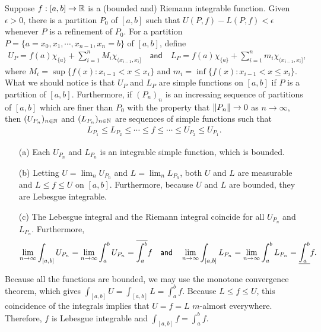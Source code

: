 Suppose $f: [a, b]\rightarrow{\mathbb{R}}$ is a (bounded and) Riemann integrable function.
Given $\epsilon>0$, there is a partition $P_0$ of $[a, b]$ such that $U(P, f)-L(P, f)<\epsilon$ whenever $P$ is a refinement of $P_0$.
For a partition $P=\{a=x_0, x_1, \cdots, x_{n-1}, x_n=b\}$ of $[a, b]$, define
\begin{align*}
    U_P=f(a)\chi_{\{a\}}+\sum_{i=1}^n M_i\chi_{(x_{i-1}, x_i]}
    \quad\textsf{and}\quad
    L_P=f(a)\chi_{\{a\}}+\sum_{i=1}^n m_i\chi_{(x_{i-1}, x_i]},
\end{align*}
where $M_i=\sup\{f(x): x_{i-1}<x\leq x_i\}$ and $m_i=\inf\{f(x): x_{i-1}<x\leq x_i\}$.
What we should notice is that $U_P$ and $L_P$ are simple functions on $[a, b]$ if $P$ is a partition of $[a, b]$.
Furthermore, if $(P_n)_n$ is an incresaing sequence of partitions of $[a, b]$ which are finer than $P_0$ with the property that ${\left\lVert{P_n}\right\rVert}\rightarrow 0$ as $n\rightarrow\infty$, then $(U_{P_n})_{n\in{\mathbb{N}}}$ and $(L_{P_n})_{n\in{\mathbb{N}}}$ are sequences of simple functions such that
\begin{align*}
    L_{P_1}\leq L_{P_2}\leq\cdots\leq f\leq\cdots\leq U_{P_2}\leq U_{P_1}.
\end{align*}
\begin{rmk}
    \begin{enumerate}
        \item[(a)]
        {
            Each $U_{P_n}$ and $L_{P_n}$ is an integrable simple function, which is bounded.
        }
        \item[(b)]
        {
            Letting $U=\lim_n U_{P_n}$ and $L=\lim_n L_{P_n}$, both $U$ and $L$ are measurable and $L\leq f\leq U$ on $[a, b]$.
            Furthermore, because $U$ and $L$ are bounded, they are Lebesgue integrable.
        }
        \item[(c)]
        {
            The Lebesgue integral and the Riemann integral coincide for all $U_{P_n}$ and $L_{P_n}$.
            Furthermore,
            \begin{align*}
                \lim_{n\rightarrow\infty}\int_{[a, b]} U_{P_n}=\lim_{n\rightarrow\infty}\int_a^b U_{P_n}=\overline{\int_a^b}f\quad\textsf{and}\quad\lim_{n\rightarrow\infty}\int_{[a, b]} L_{P_n}=\lim_{n\rightarrow\infty}\int_a^b L_{P_n}=\underline{\int_a^b}f.
            \end{align*}
        }
    \end{enumerate}
\end{rmk}
Because all the functions are bounded, we may use the monotone convergence theorem, which gives $\int_{[a, b]}U=\int_{[a, b]}L=\int_a^b f$.
Because $L\leq f\leq U$, this coincidence of the integrals implies that $U=f=L$ $m$-almost everywhere.
Therefore, $f$ is Lebesgue integrable and $\int_{[a, b]} f=\int_a^b f$.

